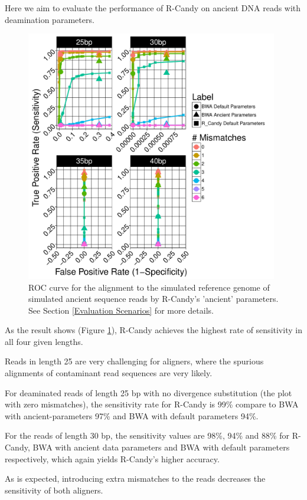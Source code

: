 \documentclass[11pt,a4paper]{report}
\begin{document}
Here we aim to evaluate the performance of R-Candy on ancient DNA reads with 
deamination parameters.


\begin{figure}[H]
\centering
\includegraphics[width=11cm]{pictures/f_DS1_emp.pdf}

\caption{
ROC curve for the alignment to the simulated reference genome of simulated ancient
sequence reads by R-Candy's 'ancient' parameters. See Section \ref{Evaluation Scenarios}
for more details.}
\label{DS1_emp}
\end{figure}


As the result shows (Figure \ref{DS1_emp}), R-Candy achieves the highest rate of
sensitivity in all four given lengths.

Reads in length 25 are very challenging for aligners, where the spurious 
alignments of contaminant read sequences are very likely.

For deaminated reads of length 25 bp with no divergence substitution (the plot
with zero mismatches), the sensitivity rate for R-Candy is 99\% compare to BWA 
with ancient-parameters 97\% and BWA with default parameters 94\%. 


For the reads of length 30 bp, the sensitivity values are 98\%, 94\% and 88\%
for R-Candy, BWA with ancient data parameters and BWA with default parameters
respectively, which again yields R-Candy's higher accuracy.

As is expected, introducing extra mismatches to the reads decreases  
the sensitivity of both aligners.
\end{document}
